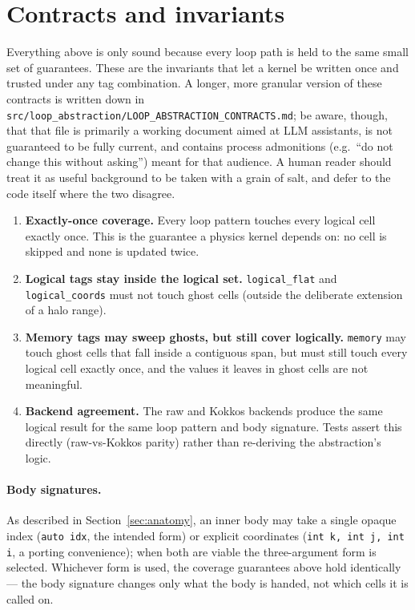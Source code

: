 \documentclass[11pt]{article}
\newcommand{\code}[1]{\lstinline[basicstyle=\ttfamily]|#1|}
\begin{document}
\section{Contracts and invariants}
\label{sec:contracts}

Everything above is only sound because every loop path is held to the same small
set of guarantees. These are the invariants that let a kernel be written once and
trusted under any tag combination. A longer, more granular version of these
contracts is written down in \code{src/loop_abstraction/LOOP_ABSTRACTION_CONTRACTS.md};
be aware, though, that that file is primarily a working document aimed at LLM
assistants, is not guaranteed to be fully current, and contains
process admonitions (e.g.\ ``do not change this without asking'') meant for that
audience. A human reader should treat it as useful background to be taken with a
grain of salt, and defer to the code itself where the two disagree.

\begin{enumerate}
\item \textbf{Exactly-once coverage.} Every loop pattern touches every logical cell
  exactly once. This is the guarantee a physics kernel depends on: no cell is
  skipped and none is updated twice.
\item \textbf{Logical tags stay inside the logical set.} \code{logical_flat} and
  \code{logical_coords} must not touch ghost cells (outside the deliberate
  extension of a halo range).
\item \textbf{Memory tags may sweep ghosts, but still cover logically.}
  \code{memory} may touch ghost cells that fall inside a contiguous span, but must
  still touch every logical cell exactly once, and the values it leaves in ghost
  cells are not meaningful.
\item \textbf{Backend agreement.} The raw and Kokkos backends produce the same
  logical result for the same loop pattern and body signature. Tests assert this
  directly (raw-vs-Kokkos parity) rather than re-deriving the abstraction's logic.
\end{enumerate}

\paragraph{Body signatures.} As described in Section~\ref{sec:anatomy}, an inner
body may take a single opaque index (\code{auto idx}, the intended form) or
explicit coordinates (\code{int k, int j, int i}, a porting convenience); when both
are viable the three-argument form is selected. Whichever form is used, the
coverage guarantees above hold identically --- the body signature changes only what
the body is handed, not which cells it is called on.
\end{document}
